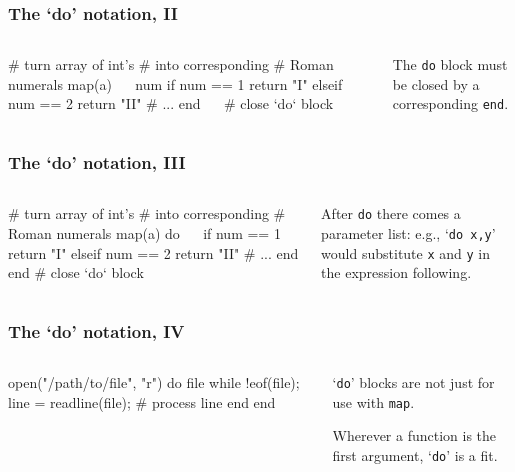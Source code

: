 \documentclass[english,serif,mathserif,xcolor=pdftex,dvipsnames,table]{beamer}
\begin{document}
\begin{frame}[fragile]
  \frametitle{The `do' notation, II}
  \begin{columns}
    \begin{column}{0.5\textwidth}
\begin{jl}
# turn array of int's
# into corresponding
# Roman numerals
map(a) ~~ num
  if num == 1
    return "I"
  elseif num == 2
    return "II"
    # ...
  end
~~ # close `do` block
\end{jl}
    \end{column}
    \begin{column}{0.5\textwidth}
      \raggedright

      The \lstinline|do| block must be closed by a corresponding
      \lstinline|end|.
    \end{column}
  \end{columns}
\end{frame}

\begin{frame}[fragile]
  \frametitle{The `do' notation, III}
  \begin{columns}
    \begin{column}{0.5\textwidth}
\begin{jl}
# turn array of int's
# into corresponding
# Roman numerals
map(a) do ~~
  if num == 1
    return "I"
  elseif num == 2
    return "II"
    # ...
  end
end # close `do` block
\end{jl}
    \end{column}
    \begin{column}{0.5\textwidth}
      \raggedright

      After \lstinline|do| there comes a parameter list:
      e.g., `\lstinline|do x,y|' would substitute \texttt{x} and
      \texttt{y} in the expression following.
    \end{column}
  \end{columns}
\end{frame}


\begin{frame}[fragile]
  \frametitle{The `do' notation, IV}
  \begin{columns}
    \begin{column}{0.5\textwidth}
\begin{jl}
open("/path/to/file", "r") do file
  while !eof(file);
    line = readline(file);
    # process line
  end
end\end{jl}
    \end{column}
    \begin{column}{0.5\textwidth}
      \raggedright

      \+\+\+\+
      `\texttt{do}' blocks are not just for use with \texttt{map}.

      \+ Wherever a function is the first argument, `\texttt{do}' is a fit.
    \end{column}
  \end{columns}
\end{frame}
\end{document}
